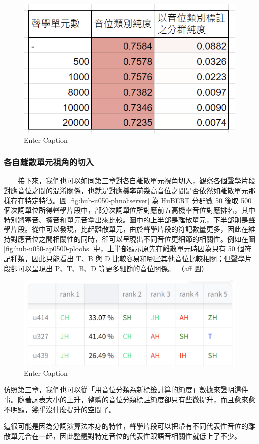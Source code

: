 {\begin{figure}
    \centering
    \includegraphics[width=0.5\linewidth]{hub100pcs--clupur.png}
    \caption{Enter Caption}
    \label{fig:enter-label}
\end{figure}
\subsubsection{各自離散單元視角的切入}
　　接下來，我們也可以如同第三章對各自離散單元視角切入，觀察各個聲學片段對應音位之間的混淆關係，也就是對應機率前幾高音位之間是否依然如離散單元那樣存在特定特徵。圖 \ref{fig:hub-u050-phnobserver} 為 HuBERT 分群數 50 後取 500 個次詞單位所得聲學片段中，部分次詞單位所對應前五高機率音位對應排名，其中特別將塞音、擦音和單元音拿出來比較。圖中的上半部是離散單元，下半部則是聲學片段。從中可以發現，比起離散單元，由於聲學片段的符記數量更多，因此在維持對應音位之間相關性的同時，卻可以呈現出不同音位更細節的相關性。例如在圖 \ref{fig:hub-u050-ap0500-ploobs} 中，上半部顯示原先在離散單元時因為只有 50 個符記種類，因此只能看出 T、B 與 D 比較容易和哪些其他音位比較相關；但聲學片段卻可以呈現出 P、T、B、D 等更多細節的音位關係。
    （aff 圖）
    \begin{figure}
        \centering
        \includegraphics[width=0.5\linewidth]{chapters/aff-hub50-500.png}
        \caption{Enter Caption}
        \label{fig:aff}
    \end{figure}


        仿照第三章，我們也可以從「用音位分類為新標籤計算的純度」數據來證明這件事。隨著詞表大小的上升，整體的音位分類標註純度卻只有些微提升，而且愈來愈不明顯，幾乎沒什麼提升的空間了。 \par
        這很可能是因為分詞演算法本身的特性，聲學片段可以把帶有不同代表性音位的離散單元合在一起，因此整體對特定音位的代表性跟語音相關性就低上了不少。  

}

